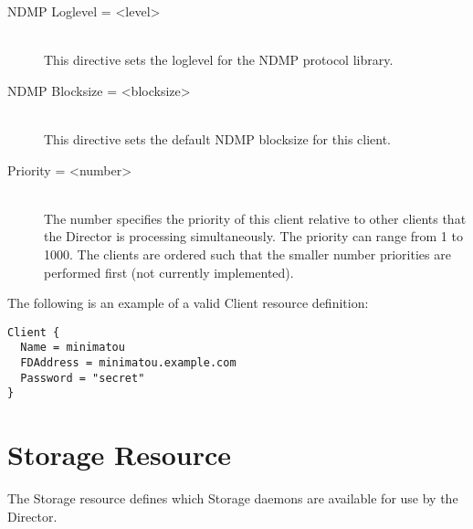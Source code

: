 \begin{description}
\item [NDMP Loglevel = {\textless}level{\textgreater}] \hfill \\
This directive sets the loglevel for the NDMP protocol library.

\item [NDMP Blocksize = {\textless}blocksize{\textgreater}] \hfill \\
This directive sets the default NDMP blocksize for this client.

\item [Priority = {\textless}number{\textgreater}] \hfill \\
The number specifies the  priority of this client relative to other clients
that the  Director is processing simultaneously. The priority can range  from
1 to 1000. The clients are ordered such that the smaller  number priorities
are performed first (not currently  implemented).

\end{description}

The following is an example of a valid Client resource definition:

\footnotesize
\begin{verbatim}
Client {
  Name = minimatou
  FDAddress = minimatou.example.com
  Password = "secret"
}
\end{verbatim}
\normalsize

\section{Storage Resource}
\label{StorageResource2}

The Storage resource defines which Storage daemons are available for use by
the Director.

